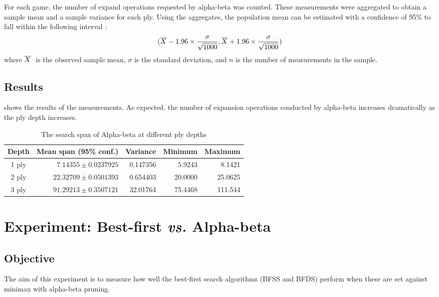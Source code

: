 For each game, the number of expand operations requested by alpha-beta was counted.  These measurements were aggregated to obtain a sample mean and a sample variance for each ply.  Using the aggregates, the population mean can be estimated with a confidence of 95\% to fall within the following interval \cite{underhill:stat}: 
\begin{equation}
(\overline{X}_{\mbox{\tiny }} - 1.96 \times \frac{\sigma} {\sqrt{1000}},
\overline{X}_{\mbox{\tiny }} + 1.96 \times \frac{\sigma}{\sqrt{1000}})
\label{eq:tree-conf95}
\end{equation} 
where  $\mean\ $ is the observed sample mean, $\sigma$ is the standard deviation, and $n$ is the number of measurements in the sample.    

\subsection*{Results}
 shows the results of the measurements.  As expected, the number of expansion operations conducted by alpha-beta increases dramatically as the ply depth increases.
\begin{table}[ht!]
	\caption{The search span of Alpha-beta at different ply depths}
	\centering
		\begin{tabular}{|c|r|r|r|r|}
		\hline
		\bf Depth & \bf Mean span (95\% conf.) & \bf Variance & \bf Minimum& \bf Maximum \\
		\hline
1 ply & $ 7.14355 \pm 0.0237925$ & 0.147356 & 5.9243 & 8.1421 \\
2 ply & $22.32709 \pm 0.0501393$ & 0.654403 & 20.0000 & 25.0625 \\
3 ply & $91.29213 \pm 0.3507121$ & 32.01764 & 75.4468 & 111.544 \\
		\hline
		\end{tabular}
	\label{tab:tree-ab-span}
\end{table}
   
\section{Experiment: Best-first {\it vs.} Alpha-beta}
\label{sec:tree-exp-bfss-ab}
\subsection*{Objective}
The aim of this experiment is to measure how well the best-first search algorithms (BFSS and BFDS) perform when these are set against minimax with alpha-beta pruning.   
